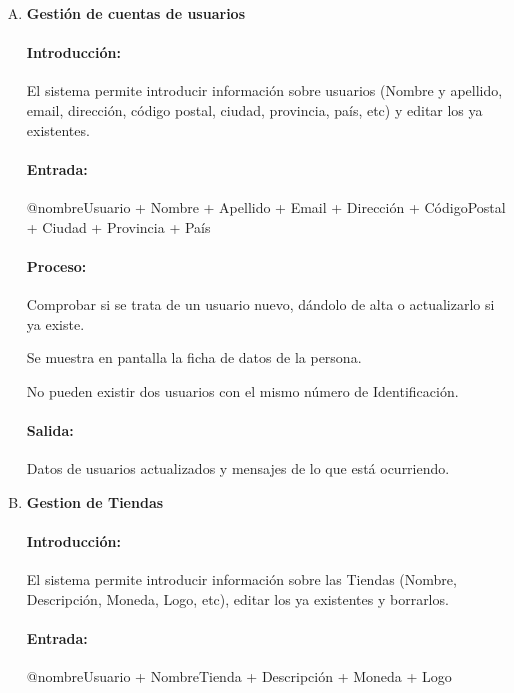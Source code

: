         \begin{enumerate}[A.]

        \item \textbf{Gestión de cuentas de usuarios}
        
        \paragraph{Introducción:} El sistema permite introducir información sobre usuarios (Nombre y apellido, email, dirección, código postal, ciudad, provincia, país, etc) y editar los ya existentes.
        
        \paragraph{Entrada:} @nombreUsuario + Nombre + Apellido + Email + Dirección + CódigoPostal + Ciudad + Provincia + País
        
        \paragraph{Proceso:} Comprobar si se trata de un usuario nuevo, dándolo de alta o actualizarlo si ya existe.                  

Se muestra en pantalla la ficha de datos de la persona.

No pueden existir dos usuarios con el mismo número de Identificación. 
        
        \paragraph{Salida:}  Datos de usuarios actualizados y mensajes de lo que está ocurriendo.
        

        \item \textbf{Gestion de Tiendas}
        
        \paragraph{Introducción:}El sistema permite introducir información sobre las Tiendas (Nombre, Descripción, Moneda, Logo, etc), editar los ya existentes y borrarlos. 
        
        \paragraph{Entrada:} @nombreUsuario + NombreTienda + Descripción + Moneda + Logo 
        

\end{enumerate}
